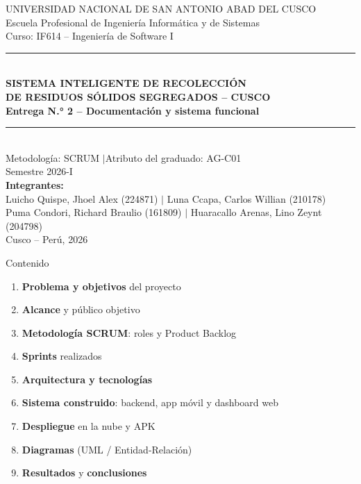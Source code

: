 \documentclass[aspectratio=169, 11pt]{beamer}
\begin{document}
\begin{frame}[plain]
    \centering
    \vspace{0.5cm}
    {\footnotesize UNIVERSIDAD NACIONAL DE SAN ANTONIO ABAD DEL CUSCO}\\
    {\footnotesize Escuela Profesional de Ingeniería Informática y de Sistemas}\\
    {\footnotesize Curso: IF614 -- Ingeniería de Software I}\\[0.4cm]

    {\color{azulin}\rule{\linewidth}{1.2pt}}\\[0.4cm]
    {\Large\bfseries\color{azulin} SISTEMA INTELIGENTE DE RECOLECCIÓN}\\[0.15cm]
    {\Large\bfseries\color{azulin} DE RESIDUOS SÓLIDOS SEGREGADOS -- CUSCO}\\[0.3cm]
    {\large\bfseries\color{azulin} Entrega N.° 2 -- Documentación y sistema funcional}\\[0.4cm]
    {\color{azulin}\rule{\linewidth}{1.2pt}}\\[0.5cm]

    {\normalsize Metodología: SCRUM \quad$|$\quad Atributo del graduado: AG-C01}\\[0.3cm]
    {\normalsize Semestre 2026-I}\\[0.5cm]

    {\footnotesize
    \textbf{Integrantes:}\\
    Luicho Quispe, Jhoel Alex (224871) $|$
    Luna Ccapa, Carlos Willian (210178)\\
    Puma Condori, Richard Braulio (161809) $|$
    Huaracallo Arenas, Lino Zeynt (204798)\\[0.2cm]
    Cusco -- Perú, 2026}
\end{frame}

\begin{frame}{Contenido}
    \begin{enumerate}
        \item \textbf{Problema y objetivos} del proyecto
        \item \textbf{Alcance} y público objetivo
        \item \textbf{Metodología SCRUM}: roles y Product Backlog
        \item \textbf{Sprints} realizados
        \item \textbf{Arquitectura y tecnologías}
        \item \textbf{Sistema construido}: backend, app móvil y dashboard web
        \item \textbf{Despliegue} en la nube y APK
        \item \textbf{Diagramas} (UML / Entidad-Relación)
        \item \textbf{Resultados} y \textbf{conclusiones}
    \end{enumerate}
\end{frame}
\end{document}
